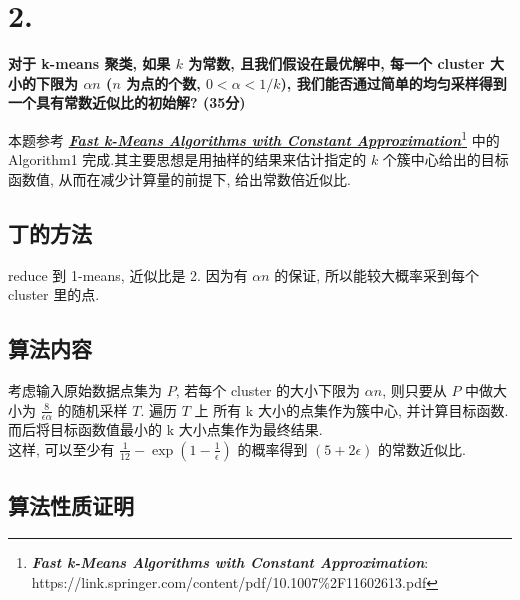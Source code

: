 \documentclass[UTF8]{article}
\newcommand{\jumpLine} {\hspace*{\fill} \par}
\begin{document}
\section*{2.}

\noindent \textbf{对于 k-means 聚类, 如果 $k$ 为常数, 且我们假设在最优解中, 每一个 cluster 大小的下限为 $\alpha n$ ($n$ 为点的个数, $0 < \alpha < 1/k$), 我们能否通过简单的均匀采样得到一个具有常数近似比的初始解? (35分)} \\\jumpLine\noindent
本题参考 \href{https://link.springer.com/content/pdf/10.1007\%2F11602613.pdf}{\textbf{\textit{Fast k-Means Algorithms with Constant Approximation}}}\footnote{\textbf{\textit{Fast k-Means Algorithms with Constant Approximation}}: https://link.springer.com/content/pdf/10.1007\%2F11602613.pdf}
中的 Algorithm1 完成.其主要思想是用抽样的结果来估计指定的 $k$ 个簇中心给出的目标函数值, 从而在减少计算量的前提下, 给出常数倍近似比. 

\subsection*{丁的方法}

reduce 到 1-means, 近似比是 2. 因为有 $\alpha n$ 的保证, 所以能较大概率采到每个 cluster 里的点.

\subsection*{算法内容}
考虑输入原始数据点集为 $P$, 若每个 cluster 的大小下限为 $\alpha n$, 则只要从 $P$ 中做大小为 $\frac{8}{\epsilon\alpha}$ 的随机采样 $T$. 遍历 $T$ 上 所有 k 大小的点集作为簇中心, 并计算目标函数. 而后将目标函数值最小的 k 大小点集作为最终结果. \\
这样, 可以至少有 $\frac{1}{12} - \exp(1-\frac{1}{\epsilon})$ 的概率得到 $(5+2\epsilon)$ 的常数近似比.

\subsection*{算法性质证明}
\end{document}
